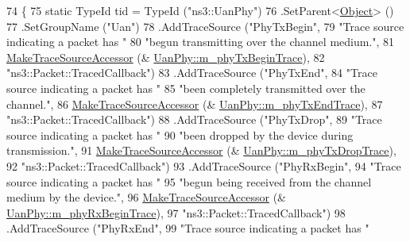 \begin{DoxyCode}
74 \{
75   \textcolor{keyword}{static} TypeId tid = TypeId (\textcolor{stringliteral}{"ns3::UanPhy"})
76     .SetParent<\hyperlink{classns3_1_1Object_a40860402e64d8008fb42329df7097cdb}{Object}> ()
77     .SetGroupName (\textcolor{stringliteral}{"Uan"})
78     .AddTraceSource (\textcolor{stringliteral}{"PhyTxBegin"},
79                      \textcolor{stringliteral}{"Trace source indicating a packet has "}
80                      \textcolor{stringliteral}{"begun transmitting over the channel medium."},
81                      \hyperlink{group__tracing_gab21a770b9855af4e8f69f7531ea4a6b0}{MakeTraceSourceAccessor} (&
      \hyperlink{classns3_1_1UanPhy_ab6c9ef4e39580603d38b957061e0dd93}{UanPhy::m\_phyTxBeginTrace}),
82                      \textcolor{stringliteral}{"ns3::Packet::TracedCallback"})
83     .AddTraceSource (\textcolor{stringliteral}{"PhyTxEnd"},
84                      \textcolor{stringliteral}{"Trace source indicating a packet has "}
85                      \textcolor{stringliteral}{"been completely transmitted over the channel."},
86                    \hyperlink{group__tracing_gab21a770b9855af4e8f69f7531ea4a6b0}{MakeTraceSourceAccessor} (&
      \hyperlink{classns3_1_1UanPhy_a8cc06e8706afacf7b9021df62599e560}{UanPhy::m\_phyTxEndTrace}),
87                      \textcolor{stringliteral}{"ns3::Packet::TracedCallback"})
88     .AddTraceSource (\textcolor{stringliteral}{"PhyTxDrop"},
89                      \textcolor{stringliteral}{"Trace source indicating a packet has "}
90                      \textcolor{stringliteral}{"been dropped by the device during transmission."},
91                      \hyperlink{group__tracing_gab21a770b9855af4e8f69f7531ea4a6b0}{MakeTraceSourceAccessor} (&
      \hyperlink{classns3_1_1UanPhy_a5fae11ade758fd7e20b21d90faadc959}{UanPhy::m\_phyTxDropTrace}),
92                      \textcolor{stringliteral}{"ns3::Packet::TracedCallback"})
93     .AddTraceSource (\textcolor{stringliteral}{"PhyRxBegin"},
94                      \textcolor{stringliteral}{"Trace source indicating a packet has "}
95                      \textcolor{stringliteral}{"begun being received from the channel medium by the device."},
96                      \hyperlink{group__tracing_gab21a770b9855af4e8f69f7531ea4a6b0}{MakeTraceSourceAccessor} (&
      \hyperlink{classns3_1_1UanPhy_a44e0cd67ddc48a376c620472ec5b1484}{UanPhy::m\_phyRxBeginTrace}),
97                      \textcolor{stringliteral}{"ns3::Packet::TracedCallback"})
98     .AddTraceSource (\textcolor{stringliteral}{"PhyRxEnd"},
99                      \textcolor{stringliteral}{"Trace source indicating a packet has "}

\end{DoxyCode}
